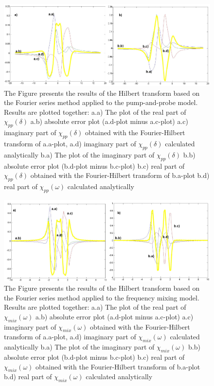 \documentclass[12pt,twoside,a4paper]{article}
\numberwithin{equation}{subsection}
\numberwithin{figure}{subsection}
\begin{document}
\begin{figure} 
  \includegraphics[width=150mm]{img/four_pnp.png}
  \caption{The Figure presents the results of the Hilbert transform based on the Fourier series method applied to the pump-and-probe model. Results are plotted together:
     a.a) The plot of the real part of ${\chi_{pp}}(\delta )$
     a.b) absolute error plot (a.d-plot minus a.c-plot)
     a.c) imaginary part of ${\chi_{pp}}(\delta )$ obtained with the Fourier-Hilbert transform of a.a-plot, 
     a.d) imaginary part of ${\chi_{pp}}(\delta )$ calculated analytically 
     b.a) The plot of the imaginary part of ${\chi_{pp}}(\delta )$ 
     b.b) absolute error plot (b.d-plot minus b.c-plot)
     b.c) real part of ${\chi_{pp}}(\delta )$ obtained with the Fourier-Hilbert transform of b.a-plot 
     b.d) real part of $\chi_{pp} (\omega )$ calculated analytically 
     \label{fig:four_pnp}
     }
\end{figure} 

\begin{figure} 
  \includegraphics[width=150mm]{img/four_fmix.png}
  \caption{ The Figure presents the results of the Hilbert transform based on the Fourier series method applied to the frequency mixing model. Results are plotted together:
     a.a) The plot of the real part of ${\chi_{mix}}(\omega )$
     a.b) absolute error plot (a.d-plot minus a.c-plot)
     a.c) imaginary part of ${\chi_{mix}}(\omega )$ obtained with the Fourier-Hilbert transform of a.a-plot, 
     a.d) imaginary part of ${\chi_{mix}}(\omega )$ calculated analytically 
     b.a) The plot of the imaginary part of ${\chi_{mix}}(\omega )$ 
     b.b) absolute error plot (b.d-plot minus b.c-plot)
     b.c) real part of ${\chi_{mix}}(\omega )$ obtained with the Fourier-Hilbert transform of b.a-plot  
     b.d) real part of $\chi_{mix} (\omega )$ calculated analytically 
     \label{fig:four_fmix}
     }
\end{figure}
\end{document}
